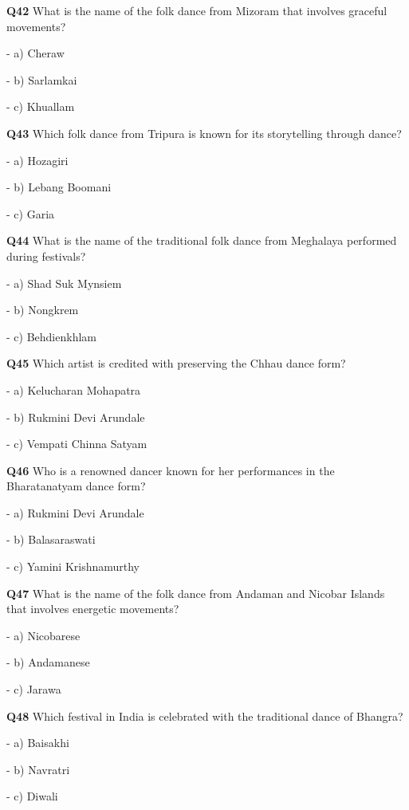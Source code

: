 \textbf{Q42} What is the name of the folk dance from Mizoram that involves graceful movements?\par
\quad - a) Cheraw\par
\quad - b) Sarlamkai\par
\quad - c) Khuallam\par

\textbf{Q43} Which folk dance from Tripura is known for its storytelling through dance?\par
\quad - a) Hozagiri\par
\quad - b) Lebang Boomani\par
\quad - c) Garia\par

\textbf{Q44} What is the name of the traditional folk dance from Meghalaya performed during festivals?\par
\quad - a) Shad Suk Mynsiem\par
\quad - b) Nongkrem\par
\quad - c) Behdienkhlam\par

\textbf{Q45} Which artist is credited with preserving the Chhau dance form?\par
\quad - a) Kelucharan Mohapatra\par
\quad - b) Rukmini Devi Arundale\par
\quad - c) Vempati Chinna Satyam\par

\textbf{Q46} Who is a renowned dancer known for her performances in the Bharatanatyam dance form?\par
\quad - a) Rukmini Devi Arundale\par
\quad - b) Balasaraswati\par
\quad - c) Yamini Krishnamurthy\par

\textbf{Q47} What is the name of the folk dance from Andaman and Nicobar Islands that involves energetic movements?\par
\quad - a) Nicobarese\par
\quad - b) Andamanese\par
\quad - c) Jarawa\par

\textbf{Q48} Which festival in India is celebrated with the traditional dance of Bhangra?\par
\quad - a) Baisakhi\par
\quad - b) Navratri\par
\quad - c) Diwali\par

